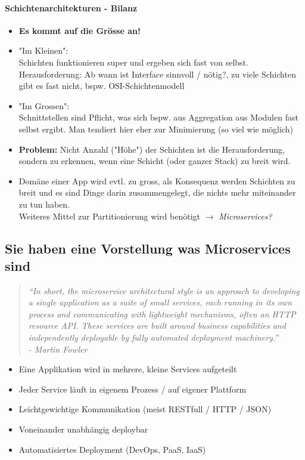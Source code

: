 \documentclass[a4paper]{article}
\begin{document}
			\paragraph{Schichtenarchitekturen - Bilanz}
			
			\begin{itemize}
				\item \textbf{Es kommt auf die Grösse an!}
				\item "Im Kleinen":\\
				Schichten funktionieren super und ergeben sich fast von selbst.\\
				Herausforderung: Ab wann ist Interface sinnvoll / nötig?, zu viele Schichten gibt es fast nicht, bspw. OSI-Schichtenmodell
				\item "Im Grossen":\\
				Schnittstellen sind Pflicht, was sich bspw. aus Aggregation aus Modulen fast selbst ergibt. Man tendiert hier eher zur Minimierung (so viel wie möglich)
				\item \textbf{Problem:} Nicht Anzahl ("Höhe") der Schichten ist die Herausforderung, sondern zu erkennen, wenn eine Schicht (oder ganzer Stack) zu breit wird.
				\item Domäne einer App wird evtl. zu gross, als Konsequenz werden Schichten zu breit und es sind Dinge darin zusammengelegt, die nichts mehr miteinander zu tun haben.\\
				Weiteres Mittel zur Partitionierung wird benötigt $\rightarrow$ \textit{Microservices?}
			\end{itemize}
		
		
		\subsection{Sie haben eine Vorstellung was Microservices sind}
		
		\begin{quote}
			\textit{“In short, the microservice architectural style is an approach to developing a single application as a suite of small services, each running in its own process and communicating with lightweight mechanisms, often an HTTP resource API. These services are built around business capabilities and independently deployable by fully automated deployment machinery.”\\
			- Martin Fowler}
		\end{quote}
		
		\begin{itemize}
			\item Eine Applikation wird in mehrere, kleine Services aufgeteilt
			\item Jeder Service läuft in eigenem Prozess / auf eigener Plattform
			\item Leichtgewichtige Kommunikation (meist RESTfull / HTTP / JSON)
			\item Voneinander unabhängig deploybar
			\item Automatisiertes Deployment (DevOps, PaaS, IaaS)
		\end{itemize}
	
\end{document}
